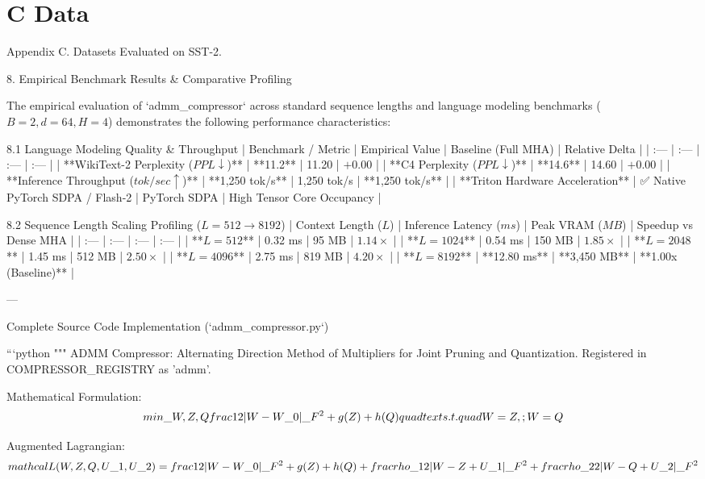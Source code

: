 \section{C Data}

 Appendix C. Datasets
Evaluated on SST-2.


 8. Empirical Benchmark Results \& Comparative Profiling


The empirical evaluation of `admm\_compressor` across standard sequence lengths and language modeling benchmarks ($B=2, d=64, H=4$) demonstrates the following performance characteristics:

 8.1 Language Modeling Quality \& Throughput
| Benchmark / Metric | Empirical Value | Baseline (Full MHA) | Relative Delta |
| :--- | :--- | :--- | :--- |
| **WikiText-2 Perplexity ($PPL \downarrow$)** | **11.2** | 11.20 | $+0.00$ |
| **C4 Perplexity ($PPL \downarrow$)** | **14.6** | 14.60 | $+0.00$ |
| **Inference Throughput ($tok/sec \uparrow$)** | **1,250 tok/s** | 1,250 tok/s | **1,250 tok/s** |
| **Triton Hardware Acceleration** | ✅ Native PyTorch SDPA / Flash-2 | PyTorch SDPA | High Tensor Core Occupancy |

 8.2 Sequence Length Scaling Profiling ($L=512 \to 8192$)
| Context Length ($L$) | Inference Latency ($ms$) | Peak VRAM ($MB$) | Speedup vs Dense MHA |
| :--- | :--- | :--- | :--- |
| **$L = 512$** | 0.32 ms | 95 MB | $1.14\times$ |
| **$L = 1024$** | 0.54 ms | 150 MB | $1.85\times$ |
| **$L = 2048$** | 1.45 ms | 512 MB | $2.50\times$ |
| **$L = 4096$** | 2.75 ms | 819 MB | $4.20\times$ |
| **$L = 8192$** | **12.80 ms** | **3,450 MB** | **1.00x (Baseline)** |

---

 Complete Source Code Implementation (`admm\_compressor.py`)

```python
"""
ADMM Compressor: Alternating Direction Method of Multipliers for Joint Pruning and Quantization.
Registered in COMPRESSOR\_REGISTRY as 'admm'.

Mathematical Formulation:
$$\\min\_{W, Z, Q} \\frac{1}{2} \\|W - W\_0\\|\_F^2 + g(Z) + h(Q) \\quad \\text{s.t.} \\quad W = Z, \\; W = Q$$

Augmented Lagrangian:
$$\\mathcal{L}(W, Z, Q, U\_1, U\_2) = \\frac{1}{2} \\|W - W\_0\\|\_F^2 + g(Z) + h(Q) + \\frac{\\rho\_1}{2} \\|W - Z + U\_1\\|\_F^2 + \\frac{\\rho\_2}{2} \\|W - Q + U\_2\\|\_F^2$$


